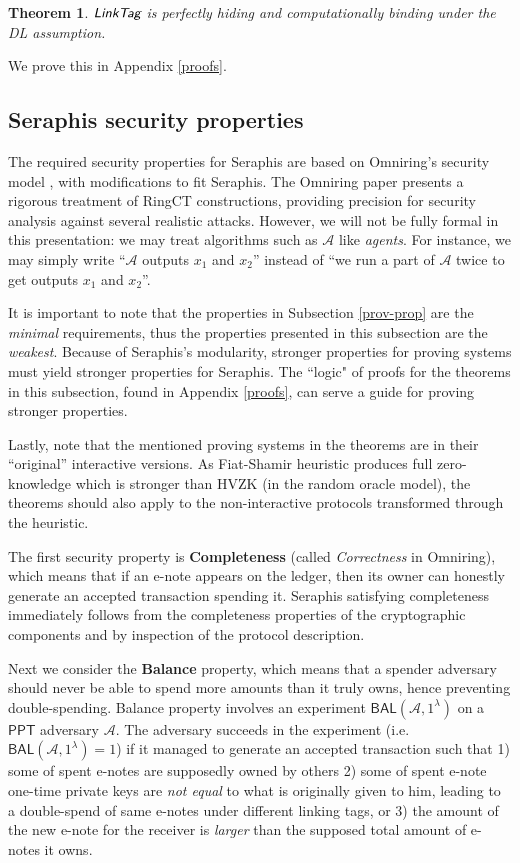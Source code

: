\documentclass{article}
\theoremstyle{plain}
\newtheorem{theorem}{Theorem}[section]
\theoremstyle{remark}
\begin{document}
\begin{theorem}\label{thm-linktag}
$\emph{\textsf{LinkTag}}$ is perfectly hiding and computationally binding under the DL assumption.
\end{theorem}
\noindent We prove this in Appendix \ref{proofs}.

\subsection{Seraphis security properties}\label{sec-thm}
The required security properties for Seraphis are based on Omniring's security model \cite{omniring}, with modifications to fit Seraphis. The Omniring paper presents a rigorous treatment of RingCT constructions, providing precision for security analysis against several realistic attacks. However, we will not be fully formal in this presentation: we may treat algorithms such as $\mathcal{A}$ like \textit{agents}. For instance, we may simply write ``$\mathcal{A}$ outputs $x_1$ and $x_2$'' instead of ``we run a part of $\mathcal{A}$ twice to get outputs $x_1$ and $x_2$''.

It is important to note that the properties in Subsection \ref{prov-prop} are the \textit{minimal} requirements, thus the properties presented in this subsection are the \textit{weakest}. Because of Seraphis's modularity, stronger properties for proving systems must yield stronger properties for Seraphis. The ``logic" of proofs for the theorems in this subsection, found in Appendix \ref{proofs}, can serve a guide for proving stronger properties.

Lastly, note that the mentioned proving systems in the theorems are in their ``original'' interactive versions. As Fiat-Shamir heuristic produces full zero-knowledge which is stronger than HVZK (in the random oracle model), the theorems should also apply to the non-interactive protocols transformed through the heuristic.

The first security property is \textbf{Completeness} (called \textit{Correctness} in Omniring), which means that if an e-note appears on the ledger, then its owner can honestly generate an accepted transaction spending it. Seraphis satisfying completeness immediately follows from the completeness properties of the cryptographic components and by inspection of the protocol description.

Next we consider the \textbf{Balance} property, which means that a spender adversary should never be able to spend more amounts than it truly owns, hence preventing double-spending. Balance property involves an experiment $\textsf{BAL}(\mathcal{A}, 1^{\lambda})$  on a $\textsf{PPT}$ adversary $\mathcal{A}$. The adversary succeeds in the experiment (i.e. $\textsf{BAL}(\mathcal{A}, 1^{\lambda})=1$) if it managed to generate an accepted transaction such that 1) some of spent e-notes are supposedly owned by others 2) some of spent e-note one-time private keys are \textit{not equal} to what is originally given to him, leading to a double-spend of same e-notes under different linking tags, or 3) the amount of the new e-note for the receiver is \textit{larger} than the supposed total amount of e-notes it owns.
\end{document}
